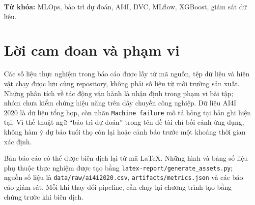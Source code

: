 \documentclass[12pt,a4paper,oneside]{report}
\newcommand{\src}[1]{\nolinkurl{#1}}
\newcommand{\dataset}{AI4I 2020}
\begin{document}
\noindent\textbf{Từ khóa:} MLOps, bảo trì dự đoán, AI4I, DVC, MLflow, XGBoost, giám sát dữ liệu.
\clearpage
\chapter*{Lời cam đoan và phạm vi}
Các số liệu thực nghiệm trong báo cáo được lấy từ mã nguồn, tệp dữ liệu và hiện vật chạy được lưu cùng repository, không phải số liệu từ môi trường sản xuất. Những phân tích về tác động vận hành là nhận định trong phạm vi bài tập; nhóm chưa kiểm chứng hiệu năng trên dây chuyền công nghiệp. Dữ liệu \dataset{} là dữ liệu tổng hợp, còn nhãn \src{Machine failure} mô tả hỏng tại bản ghi hiện tại. Vì thế thuật ngữ ``bảo trì dự đoán'' trong tên đề tài chỉ bối cảnh ứng dụng, không hàm ý dự báo tuổi thọ còn lại hoặc cảnh báo trước một khoảng thời gian xác định.

Bản báo cáo có thể được biên dịch lại từ mã LaTeX. Những hình và bảng số liệu phụ thuộc thực nghiệm được tạo bằng \src{latex-report/generate_assets.py}; nguồn số liệu là \src{data/raw/ai4i2020.csv}, \src{artifacts/metrics.json} và các báo cáo giám sát. Mỗi khi thay đổi pipeline, cần chạy lại chương trình tạo bằng chứng trước khi biên dịch.
\clearpage
\tableofcontents
\clearpage
\listoffigures
\clearpage
\listoftables
\clearpage
{}









\appendix

\end{document}
